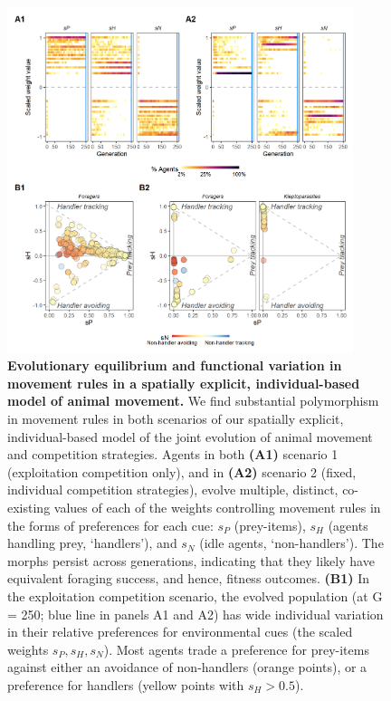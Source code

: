     \begin{figure}[h!]
        \centering
        \includegraphics[width=0.90\textwidth]{figures/patternprocess/fig_01.png}
        \caption{
            \textbf{Evolutionary equilibrium and functional variation in movement rules in a spatially explicit, individual-based model of animal movement.}
            We find substantial polymorphism in movement rules in both scenarios of our spatially explicit, individual-based model of the joint evolution of animal movement and competition strategies.
            Agents in both \textbf{(A1)} scenario 1 (exploitation competition only), and in \textbf{(A2)} scenario 2 (fixed, individual competition strategies), evolve multiple, distinct, co-existing values of each of the weights controlling movement rules in the forms of preferences for each cue: $s_P$ (prey-items), $s_H$ (agents handling prey, `handlers'), and $s_N$ (idle agents, `non-handlers').
            The morphs persist across generations, indicating that they likely have equivalent foraging success, and hence, fitness outcomes.
            \textbf{(B1)} In the exploitation competition scenario, the evolved population (at G = 250; blue line in panels A1 and A2) has wide individual variation in their relative preferences for environmental cues (the scaled weights $s_P, s_H, s_N$).
            Most agents trade a preference for prey-items against either an avoidance of non-handlers (orange points), or a preference for handlers (yellow points with $s_H > 0.5$).
}
\end{figure}

